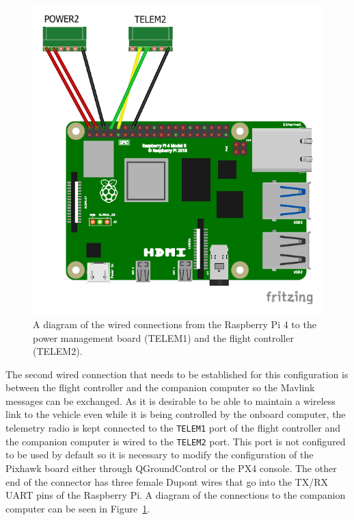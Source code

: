\begin{figure}
  \centering
  \includegraphics[keepaspectratio]{img/wiring-diagram.pdf}
  \caption{A diagram of the wired connections from the Raspberry Pi 4 to the power management board (TELEM1) and the flight controller (TELEM2).}\label{fig:wiring}
\end{figure}
The second wired connection that needs to be established for this configuration is between the flight controller and the companion computer so the Mavlink messages can be exchanged.
As it is desirable to be able to maintain a wireless link to the vehicle even while it is being controlled by the onboard computer, the telemetry radio is kept connected to the \verb|TELEM1| port of the flight controller and the companion computer is wired to the \verb|TELEM2| port.
This port is not configured to be used by default so it is necessary to modify the configuration of the Pixhawk board either through QGroundControl  or the PX4 console. 
The other end of the connector has three female Dupont wires that go into the TX/RX UART pins of the Raspberry Pi.
A diagram of the connections to the companion computer can be seen in Figure~\ref{fig:wiring}.

